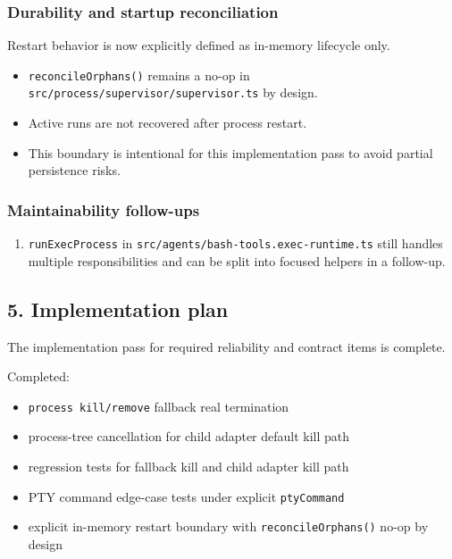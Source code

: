 \subsubsection{Durability and startup reconciliation}


Restart behavior is now explicitly defined as in-memory lifecycle only.

\begin{itemize}
  \item \texttt{reconcileOrphans()} remains a no-op in \texttt{src/process/supervisor/supervisor.ts} by design.
  \item Active runs are not recovered after process restart.
  \item This boundary is intentional for this implementation pass to avoid partial persistence risks.
\end{itemize}


\subsubsection{Maintainability follow-ups}


\begin{enumerate}
  \item \texttt{runExecProcess} in \texttt{src/agents/bash-tools.exec-runtime.ts} still handles multiple responsibilities and can be split into focused helpers in a follow-up.
\end{enumerate}


\subsection{5. Implementation plan}


The implementation pass for required reliability and contract items is complete.

Completed:

\begin{itemize}
  \item \texttt{process kill/remove} fallback real termination
  \item process-tree cancellation for child adapter default kill path
  \item regression tests for fallback kill and child adapter kill path
  \item PTY command edge-case tests under explicit \texttt{ptyCommand}
  \item explicit in-memory restart boundary with \texttt{reconcileOrphans()} no-op by design
\end{itemize}


